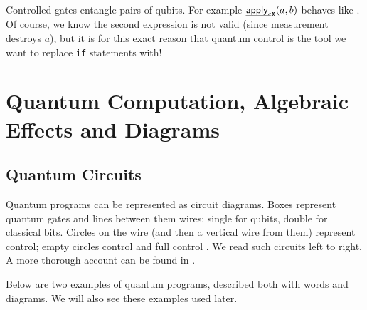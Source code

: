 \documentclass[a4paper]{article}
\begin{document}
\begin{example}
    Controlled gates entangle pairs of qubits. For example \( \eapply{\ctl X}{a, b} \) behaves like 
    .
    Of course, we know the second expression is not valid (since measurement destroys \(a\)),
    but it is for this exact reason that quantum control is the tool we want to replace \texttt{if} statements with!
\end{example}


\section{Quantum Computation, Algebraic Effects and Diagrams}

\subsection{Quantum Circuits}

Quantum programs can be represented as circuit diagrams.
Boxes represent quantum gates and lines between them wires; single for qubits, double for classical bits.
Circles on the wire (and then a vertical wire from them)
represent control; empty circles control  and full control .
We read such circuits left to right.
A more thorough account can be found in \cite{ess-qc}.


Below are two examples of quantum programs, described both with words and diagrams. We will also see these examples used later.

\end{document}
